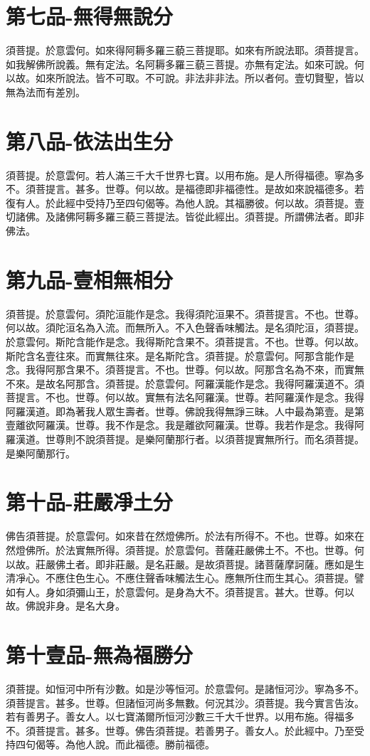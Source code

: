 \documentclass[a6paper, 22pt, twocolumn]{cvertbook}
\begin{document}
\chapter{第七品-無得無說分}
須菩提。於意雲何。如來得阿耨多羅三藐三菩提耶。如來有所說法耶。須菩提言。如我解佛所說義。無有定法。名阿耨多羅三藐三菩提。亦無有定法。如來可說。何以故。如來所說法。皆不可取。不可說。非法非非法。所以者何。壹切賢聖，皆以無為法而有差別。
\chapter{第八品-依法出生分}
須菩提。於意雲何。若人滿三千大千世界七寶。以用布施。是人所得福德。寧為多不。須菩提言。甚多。世尊。何以故。是福德即非福德性。是故如來說福德多。若復有人。於此經中受持乃至四句偈等。為他人說。其福勝彼。何以故。須菩提。壹切諸佛。及諸佛阿耨多羅三藐三菩提法。皆從此經出。須菩提。所謂佛法者。即非佛法。
\chapter{第九品-壹相無相分}
須菩提。於意雲何。須陀洹能作是念。我得須陀洹果不。須菩提言。不也。世尊。何以故。須陀洹名為入流。而無所入。不入色聲香味觸法。是名須陀洹，須菩提。於意雲何。斯陀含能作是念。我得斯陀含果不。須菩提言。不也。世尊。何以故。斯陀含名壹往來。而實無往來。是名斯陀含。須菩提。於意雲何。阿那含能作是念。我得阿那含果不。須菩提言。不也。世尊。何以故。阿那含名為不來，而實無不來。是故名阿那含。須菩提。於意雲何。阿羅漢能作是念。我得阿羅漢道不。須菩提言。不也。世尊。何以故。實無有法名阿羅漢。世尊。若阿羅漢作是念。我得阿羅漢道。即為著我人眾生壽者。世尊。佛說我得無諍三昧。人中最為第壹。是第壹離欲阿羅漢。世尊。我不作是念。我是離欲阿羅漢。世尊。我若作是念。我得阿羅漢道。世尊則不說須菩提。是樂阿蘭那行者。以須菩提實無所行。而名須菩提。是樂阿蘭那行。
\chapter{第十品-莊嚴凈土分}
佛告須菩提。於意雲何。如來昔在然燈佛所。於法有所得不。不也。世尊。如來在然燈佛所。於法實無所得。須菩提。於意雲何。菩薩莊嚴佛土不。不也。世尊。何以故。莊嚴佛土者。即非莊嚴。是名莊嚴。是故須菩提。諸菩薩摩訶薩。應如是生清凈心。不應住色生心。不應住聲香味觸法生心。應無所住而生其心。須菩提。譬如有人。身如須彌山王，於意雲何。是身為大不。須菩提言。甚大。世尊。何以故。佛說非身。是名大身。

\chapter{第十壹品-無為福勝分}
須菩提。如恒河中所有沙數。如是沙等恒河。於意雲何。是諸恒河沙。寧為多不。須菩提言。甚多。世尊。但諸恒河尚多無數。何況其沙。須菩提。我今實言告汝。若有善男子。善女人。以七寶滿爾所恒河沙數三千大千世界。以用布施。得福多不。須菩提言。甚多。世尊。佛告須菩提。若善男子。善女人。於此經中。乃至受持四句偈等。為他人說。而此福德。勝前福德。
\end{document}
